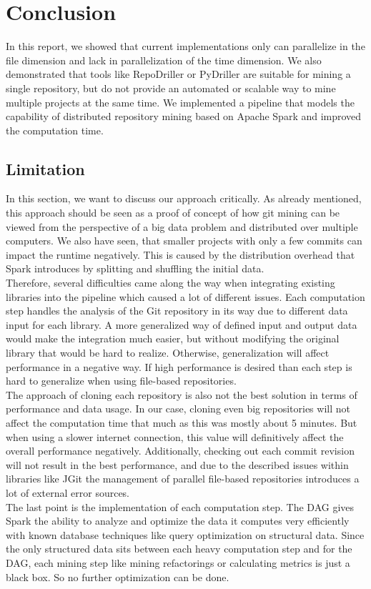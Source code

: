\documentclass[conference]{IEEEtran}
\begin{document}
\section{Conclusion}
In this report, we showed that current implementations only can parallelize in the file dimension and lack in parallelization of the time dimension. We also demonstrated that tools like RepoDriller or PyDriller are suitable for mining a single repository, but do not provide an automated or scalable way to mine multiple projects at the same time. We implemented a pipeline that models the capability of distributed repository mining based on Apache Spark and improved the computation time.
\subsection{Limitation}
In this section, we want to discuss our approach critically. As already mentioned, this approach should be seen as a proof of concept of how git mining can be viewed from the perspective of a big data problem and distributed over multiple computers. We also have seen, that smaller projects with only a few commits can impact the runtime negatively. This is caused by the distribution overhead that Spark introduces by splitting and shuffling the initial data.\\
Therefore, several difficulties came along the way when integrating existing libraries into the pipeline which caused a lot of different issues. Each computation step handles the analysis of the Git repository in its way due to different data input for each library. A more generalized way of defined input and output data would make the integration much easier, but without modifying the original library that would be hard to realize. Otherwise, generalization will affect performance in a negative way. If high performance is desired than each step is hard to generalize when using file-based repositories.\\
The approach of cloning each repository is also not the best solution in terms of performance and data usage. In our case, cloning even big repositories will not affect the computation time that much as this was mostly about 5 minutes. But when using a slower internet connection, this value will definitively affect the overall performance negatively. Additionally, checking out each commit revision will not result in the best performance, and due to the described issues within libraries like JGit the management of parallel file-based repositories introduces a lot of external error sources.\\
The last point is the implementation of each computation step. The DAG gives Spark the ability to analyze and optimize the data it computes very efficiently with known database techniques like query optimization on structural data. Since the only structured data sits between each heavy computation step and for the DAG, each mining step like mining refactorings or calculating metrics is just a black box. So no further optimization can be done.
\end{document}
